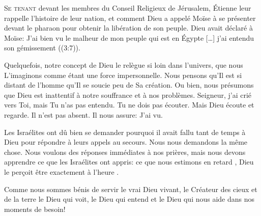 


\lettrine{S}{e tenant} devant les membres du Conseil Religieux de Jérusalem,
 Étienne  leur rappelle l'histoire de leur nation,
 et comment Dieu a appelé Moïse à se présenter devant le pharaon
 pour obtenir la libération de son peuple.
 Dieu avait déclaré à Moïse: 
 \Og J'ai bien vu le malheur de mon peuple qui est en Égypte [\dots{}]
 j'ai entendu son gémissement \Fg{} ((3:7)). 

Quelquefois, notre concept de Dieu le relègue si loin dans l'univers,
 que nous L'imaginons comme étant une force impersonnelle.
 Nous pensons qu'Il est si distant de l'homme qu'Il se soucie peu de Sa création.
 Ou bien, nous présumons que Dieu est inattentif à notre souffrance
 et à nos problèmes.
 \Og Seigneur, j'ai crié vers Toi, mais Tu n'as pas entendu.
 Tu ne dois pas écouter. \Fg{}
 Mais Dieu écoute et regarde. Il n'est pas absent.
 Il nous assure: \Og J'ai vu. \Fg{} 

Les Israélites ont dû bien se demander pourquoi il avait fallu
 tant de temps à Dieu pour répondre à leurs appels au secours.
 Nous nous demandons la même chose. Nous voulons des réponses immédiates
 à nos prières, mais nous devons apprendre ce que les Israélites
 ont appris: ce que nous estimons \Og en retard \Fg{},
 Dieu le per\c{c}oit \Og être exactement à l'heure \Fg{}.


Comme nous sommes bénis de servir le vrai Dieu vivant,
 le Créateur des cieux et de la terre \ocadr le Dieu qui voit,
 le Dieu qui entend et le Dieu qui nous aide dans nos moments de besoin!

\dvrule




